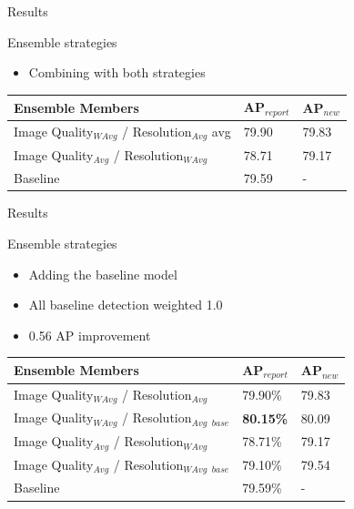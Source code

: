 \begin{frame}{Results}{}
    \begin{block}{Ensemble strategies}
    \begin{itemize}
        \item Combining with both strategies  
    \end{itemize}  
\end{block} 

    \begin{table}[]
    \centering
    \begin{tabular}{|l|l|l|}
    \hline
    \textbf{Ensemble Members} & \textbf{AP$_{report}$} & \textbf{AP$_{new}$} \\ \hline
    Image Quality$_{WAvg}$ / Resolution$_{Avg}$ avg                                          & 79.90     & 79.83  \\ \hline
    Image Quality$_{Avg}$ / Resolution$_{WAvg}$                                         & 78.71     & 79.17  \\ \hline
    Baseline                                                   & 79.59     & -      \\ \hline
    \end{tabular}
    \end{table}
\end{frame}

\begin{frame}{Results}{}
    \begin{block}{Ensemble strategies}
    \begin{itemize}
        \item Adding the baseline model
        \item All baseline detection weighted 1.0
        \item 0.56 AP improvement
    \end{itemize}  
\end{block} 
    \begin{table}[h]
    \centering
    \begin{tabular}{|l|l|l|}
    \hline
    \textbf{Ensemble Members}                  & \textbf{AP$_{report}$} & \textbf{AP$_{new}$} \\ \hline
    Image Quality$_{WAvg}$ / Resolution$_{Avg}$  & 79.90\% & 79.83 \\ \hline
    Image Quality$_{WAvg}$ / Resolution$_{Avg}$ $_{base}$ & \textbf{80.15\%} & 80.09 \\ \hline
    Image Quality$_{Avg}$ / Resolution$_{WAvg}$ & 78.71\% & 79.17 \\ \hline
    Image Quality$_{Avg}$ / Resolution$_{WAvg}$ $_{base}$ & 79.10\% & 79.54\\ \hline
    Baseline                          & 79.59\% & -\\ \hline
    \end{tabular}
    \end{table}
\end{frame}

